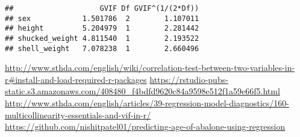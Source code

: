 \documentclass[
]{article}
\begin{document}
\begin{verbatim}
##                    GVIF Df GVIF^(1/(2*Df))
## sex            1.501786  2        1.107011
## height         5.204979  1        2.281442
## shucked_weight 4.811540  1        2.193522
## shell_weight   7.078238  1        2.660496
\end{verbatim}

\url{http://www.sthda.com/english/wiki/correlation-test-between-two-variables-in-r\#install-and-load-required-r-packages}
\url{https://rstudio-pubs-static.s3.amazonaws.com/408480_f4bdfd9620c84a9598e512f1a59e66f5.html}
\url{http://www.sthda.com/english/articles/39-regression-model-diagnostics/160-multicollinearity-essentials-and-vif-in-r/}
\url{https://github.com/nishitpatel01/predicting-age-of-abalone-using-regression}
\end{document}
